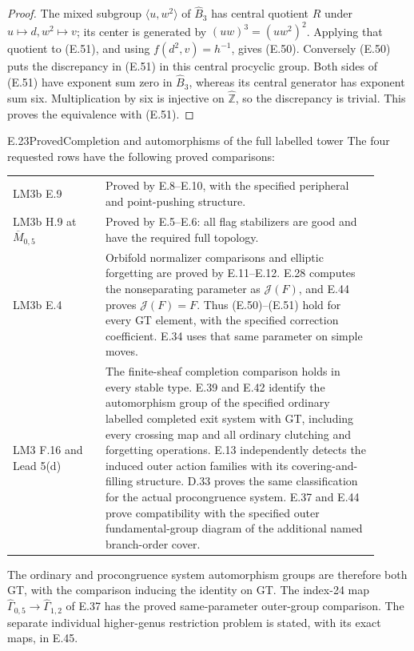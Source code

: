 \begin{proof}
The mixed subgroup $\langle u,w^2\rangle$ of
$\widehat B_3$ has central quotient $R$ under
$u\mapsto d,w^2\mapsto v$; its center is generated
by $(uw)^3=(uw^2)^2$.  Applying that quotient to
(E.51), and using $f(d^2,v)=h^{-1}$, gives (E.50).
Conversely (E.50) puts the discrepancy in (E.51)
in this central procyclic group.  Both sides of
(E.51) have exponent sum zero in $\widehat B_3$,
whereas its central generator has exponent sum six.
Multiplication by six is injective on
$\widehat{\mathbb Z}$, so the discrepancy is trivial.
This proves the equivalence with (E.51).
\end{proof}

\begin{result}{E.23}{Proved}{Completion and automorphisms of the full labelled tower}
The four requested rows have the following proved comparisons:
\begin{center}
\begin{tabular}{p{0.23\linewidth}|p{0.68\linewidth}}
LM3b E.9 & Proved by E.8--E.10, with the specified
peripheral and point-pushing structure.\\
LM3b H.9 at $\overline M_{0,5}$ & Proved by E.5--E.6:
all flag stabilizers are good and have the required full topology.\\
LM3b E.4 & Orbifold normalizer comparisons and elliptic
forgetting are proved by E.11--E.12. E.28 computes the
nonseparating parameter as $\mathcal J(F)$, and E.44
proves $\mathcal J(F)=F$. Thus (E.50)--(E.51) hold
for every GT element, with the specified correction
coefficient. E.34 uses that same parameter on simple moves.\\
LM3 F.16 and Lead 5(d) & The finite-sheaf completion
comparison holds in every stable type. E.39 and E.42
identify the automorphism group of the specified ordinary
labelled completed exit system with GT, including every
crossing map and all ordinary clutching and forgetting
operations. E.13 independently detects the induced outer
action families with its covering-and-filling structure.
D.33 proves the same classification for the actual
procongruence system. E.37 and E.44 prove compatibility
with the specified outer fundamental-group diagram of
the additional named branch-order cover.
\end{tabular}
\end{center}
The ordinary and procongruence system automorphism groups
are therefore both GT, with the comparison inducing the
identity on GT. The index-24 map
$\widehat\Gamma_{0,5}\to\widehat\Gamma_{1,2}$ of E.37
has the proved same-parameter outer-group comparison.
The separate individual higher-genus restriction problem
is stated, with its exact maps, in E.45.
\end{result}
